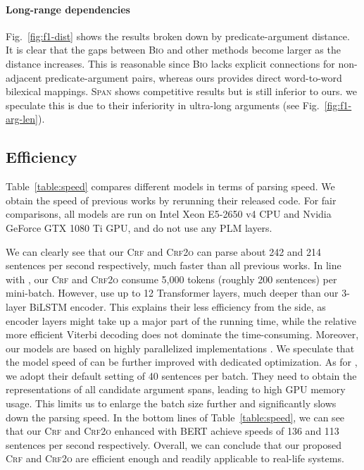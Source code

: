 \documentclass[11pt]{article}
\begin{document}
\paragraph{Long-range dependencies}
Fig.~\ref{fig:f1-dist} shows the results broken down by predicate-argument distance.
It is clear that the gaps between \textsc{Bio} and other methods become larger as the distance increases.
This is reasonable since \textsc{Bio} lacks explicit connections for non-adjacent predicate-argument pairs, whereas ours provides direct word-to-word bilexical mappings.
\textsc{Span} shows competitive results but is still inferior to ours.
we speculate this is due to their inferiority in ultra-long arguments (see Fig.~\ref{fig:f1-arg-len}).

\subsection{Efficiency}\label{sec:speed}

Table~\ref{table:speed} compares different models in terms of parsing speed.
We obtain the speed of previous works by rerunning their released code.
For fair comparisons, all models are run on Intel Xeon E5-2650 v4 CPU and Nvidia GeForce GTX 1080 Ti GPU, and do not use any PLM layers.

We can clearly see that our \textsc{Crf} and \textsc{Crf2o} can parse about 242 and 214 sentences per second respectively, much faster than all previous works.
In line with \citet{strubell-etal-2018-lisa}, our \textsc{Crf} and \textsc{Crf2o} consume 5,000 tokens (roughly 200 sentences) per mini-batch.
However, \citet{strubell-etal-2018-lisa} use up to 12 Transformer layers, much deeper than our 3-layer BiLSTM encoder.
This explains their less efficiency from the side, as encoder layers might take up a major part of the running time, while the relative more efficient Viterbi decoding does not dominate the time-consuming.
Moreover, our models are based on highly parallelized implementations \cite{zhang-etal-2020-efficient}.
We speculate that the model speed of \citet{strubell-etal-2018-lisa} can be further improved with dedicated optimization.
As for \citet{he-etal-2018-jointly,li-etal-2019-dependency}, we adopt their default setting of 40 sentences per batch.
They need to obtain the representations of all candidate argument spans, leading to high GPU memory usage.
This limits us to enlarge the batch size further and significantly slows down the parsing speed.
In the bottom lines of Table~\ref{table:speed}, we can see that our \textsc{Crf} and \textsc{Crf2o} enhanced with BERT achieve speeds of 136 and 113 sentences per second respectively.
Overall, we can conclude that our proposed \textsc{Crf} and \textsc{Crf2o} are efficient enough and readily applicable to real-life systems.
\end{document}
